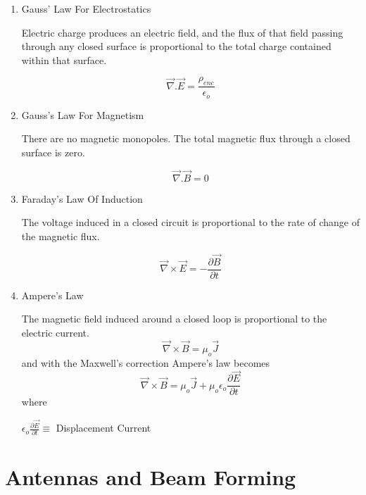 \begin{enumerate}
   \item Gauss’ Law For Electrostatics

      Electric charge produces an electric field, and the flux of that field passing through any closed surface is proportional to the total charge contained within that surface.

      \begin{equation}
      \vec{\nabla}.\vec{E} = \frac{\rho_{enc}}{\epsilon_{o}}
      \end{equation}

   \item Gauss’s Law For Magnetism

   There are no magnetic monopoles. The total magnetic flux through a closed surface is zero.

   \begin{equation}
   \vec{\nabla}.\vec{B} = 0
   \end{equation}

   \item Faraday’s Law Of Induction

   The voltage induced in a closed circuit is proportional to the rate of change of the magnetic flux.

   \begin{equation}
   \vec{\nabla}\times\vec{E} = - \frac{\partial\vec{B}}{\partial t}
   \end{equation}

   \item Ampere’s Law

      The magnetic field induced around a closed loop is proportional to the electric current.
      \begin{equation}
      \vec{\nabla}\times\vec{B} =\mu_{o}\vec{J}
      \end{equation}
      and with the Maxwell's correction Ampere's law becomes
      \begin{equation}
      \vec{\nabla}\times\vec{B} =\mu_{o}\vec{J}+\mu_{o}\epsilon_{o}\frac{\partial\vec{E}}{\partial t}
      \end{equation}
      where

      $\epsilon_{o}\frac{\partial\vec{E}}{\partial t}\equiv$ Displacement Current

\end{enumerate}

\section{Antennas and Beam Forming}

